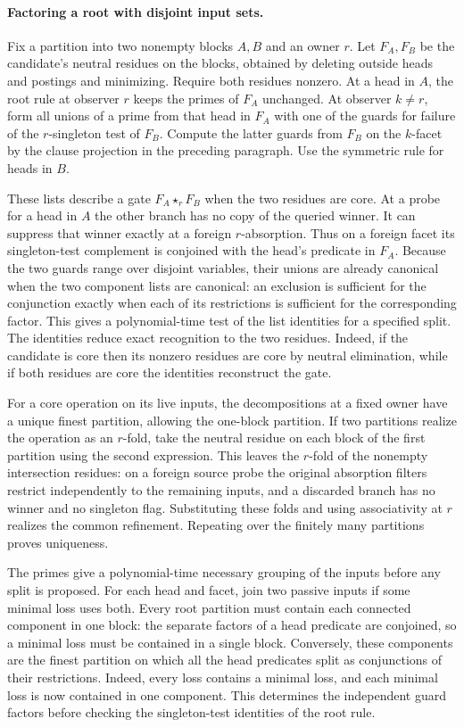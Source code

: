 \paragraph{Factoring a root with disjoint input sets.}
Fix a partition into two nonempty blocks $A,B$ and an
owner $r$. Let $F_A,F_B$ be the candidate's neutral
residues on the blocks, obtained by deleting outside
heads and postings and minimizing. Require both
residues nonzero. At a head in $A$, the root rule at
observer $r$ keeps the primes of $F_A$ unchanged.
At observer $k\ne r$, form all unions of a prime
from that head in $F_A$ with one of the guards for
failure of the $r$-singleton test of $F_B$. Compute
the latter guards from $F_B$ on the $k$-facet by the
clause projection in the preceding paragraph.
Use the symmetric rule for heads in $B$.

These lists describe a gate $F_A\star_r F_B$ when
the two residues are core. At a probe for a head
in $A$ the other branch has no copy of the queried
winner. It can suppress that winner exactly at a
foreign $r$-absorption. Thus on a foreign facet its
singleton-test complement is conjoined with the
head's predicate in $F_A$. Because the two guards
range over disjoint variables, their unions are
already canonical when the two component lists
are canonical: an exclusion is sufficient for the
conjunction exactly when each of its restrictions
is sufficient for the corresponding factor. This
gives a polynomial-time test of the list identities
for a specified split. The identities reduce exact
recognition to the two residues. Indeed, if the
candidate is core then its nonzero residues are
core by neutral elimination, while if both residues
are core the identities reconstruct the gate.

For a core operation on its live inputs, the
decompositions at a fixed owner have a unique
finest partition, allowing the one-block partition.
If two partitions realize the operation as an
$r$-fold, take the neutral residue on each block of
the first partition using the second expression.
This leaves the $r$-fold of the nonempty intersection
residues: on a foreign source probe the original
absorption filters restrict independently to the
remaining inputs, and a discarded branch has no
winner and no singleton flag. Substituting these
folds and using associativity at $r$ realizes the
common refinement. Repeating over the finitely
many partitions proves uniqueness.

The primes give a polynomial-time necessary grouping
of the inputs before any split is proposed. For each
head and facet, join two passive inputs if some
minimal loss uses both. Every root partition must
contain each connected component in one block: the
separate factors of a head predicate are conjoined,
so a minimal loss must be contained in a single
block. Conversely, these components are the finest
partition on which all the head predicates split as
conjunctions of their restrictions. Indeed, every
loss contains a minimal loss, and each minimal loss
is now contained in one component. This determines
the independent guard factors before checking the
singleton-test identities of the root rule.

